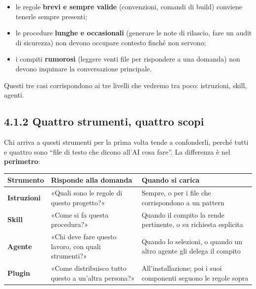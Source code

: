 \documentclass[
  italian,
  10pt,
]{book}
\newcounter{none} %
\providecommand{\tightlist}{%
  \setlength{\itemsep}{0pt}\setlength{\parskip}{0pt}}
\begin{document}
\begin{itemize}
\tightlist
\item
  le regole \textbf{brevi e sempre valide} (convenzioni, comandi di
  build) conviene tenerle sempre presenti;
\item
  le procedure \textbf{lunghe e occasionali} (generare le note di
  rilascio, fare un audit di sicurezza) non devono occupare contesto
  finché non servono;
\item
  i compiti \textbf{rumorosi} (leggere venti file per rispondere a una
  domanda) non devono inquinare la conversazione principale.
\end{itemize}

Questi tre casi corrispondono ai tre livelli che vedremo tra poco:
istruzioni, skill, agenti.

\subsection{4.1.2 Quattro strumenti, quattro
scopi}\label{quattro-strumenti-quattro-scopi}

Chi arriva a questi strumenti per la prima volta tende a confonderli,
perché tutti e quattro sono ``file di testo che dicono all'AI cosa
fare''. La differenza è nel \textbf{perimetro}:

{\def\LTcaptype{none} %
\begin{longtable}[]{@{}
  >{\raggedright\arraybackslash}p{}
  >{\raggedright\arraybackslash}p{}
  >{\raggedright\arraybackslash}p{}@{}}
\toprule\noalign{}
\begin{minipage}[b]{\linewidth}\raggedright
Strumento
\end{minipage} & \begin{minipage}[b]{\linewidth}\raggedright
Risponde alla domanda
\end{minipage} & \begin{minipage}[b]{\linewidth}\raggedright
Quando si carica
\end{minipage} \\
\midrule\noalign{}
\endhead
\bottomrule\noalign{}
\endlastfoot
\textbf{Istruzioni} & «Quali sono le regole di questo progetto?» &
Sempre, o per i file che corrispondono a un pattern \\
\textbf{Skill} & «Come si fa questa procedura?» & Quando il compito la
rende pertinente, o su richiesta esplicita \\
\textbf{Agente} & «Chi deve fare questo lavoro, con quali strumenti?» &
Quando lo selezioni, o quando un altro agente gli delega il compito \\
\textbf{Plugin} & «Come distribuisco tutto questo a un'altra persona?» &
All'installazione; poi i suoi componenti seguono le regole sopra \\
\end{longtable}
}
\end{document}
